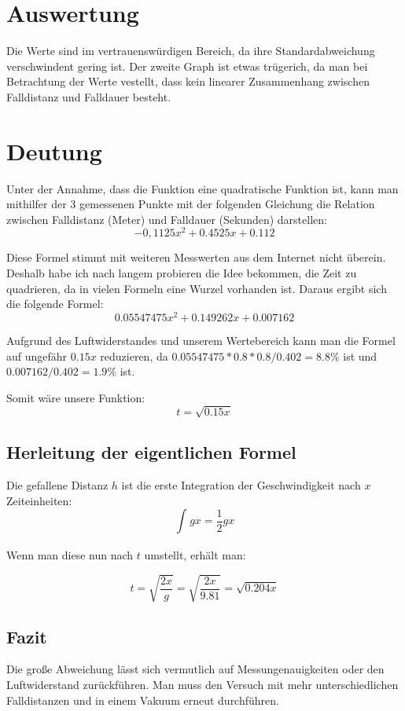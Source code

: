 \documentclass[8pt, letterpaper]{article}
\begin{document}

\section{Auswertung}
Die Werte sind im vertrauenswürdigen Bereich, da ihre Standardabweichung verschwindent gering ist.
Der zweite Graph ist etwas trügerich, da man bei Betrachtung der Werte vestellt, dass kein linearer Zusammenhang zwischen Falldistanz und Falldauer besteht.

\section{Deutung}
Unter der Annahme, dass die Funktion eine quadratische Funktion ist, kann man mithilfer der 3 gemessenen Punkte mit der folgenden Gleichung die Relation zwischen Falldistanz (Meter) und Falldauer (Sekunden) darstellen:
\[ -0,1125x^{2} + 0.4525x + 0.112 \]

Diese Formel stimmt mit weiteren Messwerten aus dem Internet nicht überein. Deshalb habe ich nach langem probieren die Idee bekommen, die Zeit zu quadrieren, da in vielen Formeln eine Wurzel vorhanden ist. Daraus ergibt sich die folgende Formel:
\[ 0.05547475x^{2} + 0.149262x + 0.007162 \]

Aufgrund des Luftwiderstandes und unserem Wertebereich kann man die Formel auf ungefähr $0.15x$ reduzieren, da $0.05547475 * 0.8 * 0.8 / 0.402 = 8.8\%$ ist und $0.007162 / 0.402 = 1.9\%$ ist.

Somit wäre unsere Funktion:
\[ t = \sqrt{0.15x} \]

\subsection{Herleitung der eigentlichen Formel}
Die gefallene Distanz $h$ ist die erste Integration der Geschwindigkeit nach $x$ Zeiteinheiten:
\[ \int_{}^{}gx=\frac{1}{2}gx \]

Wenn man diese nun nach $t$ umstellt, erhält man:

\[ t = \sqrt{\frac{2x}{g}} = \sqrt{\frac{2x}{9.81}} = \sqrt{0.204x} \]

\subsection{Fazit}
Die große Abweichung lässt sich vermutlich auf Messungenauigkeiten oder den Luftwiderstand zurückführen. Man muss den Versuch mit mehr unterschiedlichen Falldistanzen und in einem Vakuum erneut durchführen.

% 
\end{document}
